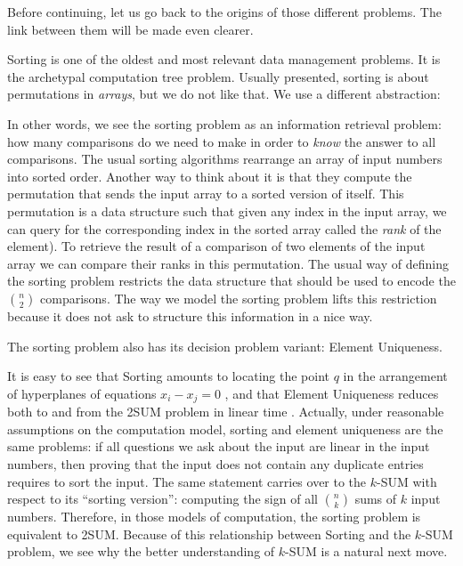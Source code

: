 
Before continuing, let us go back to the origins of those different problems.
The link between them will be made even clearer.

Sorting is one of the oldest and most relevant data management problems.
It is the archetypal computation tree problem.
%
Usually presented, sorting is about permutations in \emph{arrays}, but we do
not like that. We use a different abstraction:
%


In other words, we see the sorting problem as an information retrieval problem:
how many comparisons do we need to make in order to \emph{know} the answer to
all comparisons.
%
The usual sorting algorithms rearrange an array of input numbers into sorted
order. Another way to think about it is that they compute the permutation that
sends the input array to a sorted version of itself. This permutation is a data
structure such that given any index in the input array, we can query for the
corresponding index in the sorted array called the \emph{rank} of the element).
To retrieve the result of a comparison of two elements of the input array we can
compare their ranks in this permutation.
The usual way of defining the sorting problem restricts the data structure that
should be used to encode the \(n \choose 2\) comparisons.
The way we model the sorting problem lifts this restriction because it does not
ask to structure this information in a nice way.

The sorting problem also has its decision problem variant: Element Uniqueness.
%


It is easy to see
that Sorting amounts to locating the point \(q\) in
the arrangement of hyperplanes of equations \(x_i - x_j = 0\)%
, and
that Element Uniqueness reduces both to and from the 2SUM
problem in linear time%
.
%
Actually, under reasonable assumptions on the computation model, sorting and
element uniqueness are the same problems: if all questions we ask about the
input are linear in the input numbers, then proving that the input
does not contain any duplicate entries requires to sort the input.
%
The same statement carries over to the \(k\)-SUM with respect to its ``sorting
version'': computing the sign of all \(n \choose k\) sums of \(k\) input
numbers.
%
Therefore, in those models of computation, the sorting problem is equivalent to
2SUM.
%
Because of this relationship between Sorting and the \(k\)-SUM problem,
we see why the better understanding of \(k\)-SUM is a natural next move.

